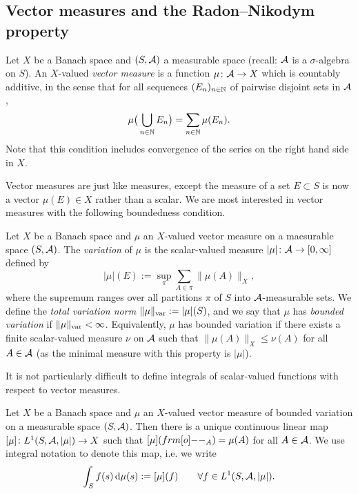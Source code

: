 

\subsection{Vector measures and the Radon--Nikodym property}

\begin{defn}
  Let $X$ be a Banach space and $(S,\mathcal{A})$ a measurable space (recall: $\mathcal{A}$ is a $\sigma$-algebra on $S$).
  An $X$-valued \emph{vector measure} is a function $\mu \colon \mathcal{A} \rightarrow X$ which is countably additive, in the sense that for all sequences $(E_n)_{n \in \mathbb{N}}$ of pairwise disjoint sets in $\mathcal{A}$,
  \begin{equation*}
    \mu\big( \bigcup_{n \in \mathbb{N}} E_n \big) = \sum_{n \in \mathbb{N}} \mu(E_n).
  \end{equation*}
  Note that this condition includes convergence of the series on the right hand side in $X$.
\end{defn}

Vector measures are just like measures, except the measure of a set $E \subset S$ is now a vector $\mu(E) \in X$ rather than a scalar.
We are most interested in vector measures with the following boundedness condition.

\begin{defn}
  Let $X$ be a Banach space and $\mu$ an $X$-valued vector measure on a maesurable space $(S,\mathcal{A})$.
  The \emph{variation} of $\mu$ is the scalar-valued measure $|\mu| \colon \mathcal{A} \rightarrow [0,\infty]$ defined by
  \begin{equation*}
    |\mu|(E) := \sup_{\pi} \sum_{A \in \pi} \|\mu(A)\|_X,
  \end{equation*}
  where the supremum ranges over all partitions $\pi$ of $S$ into $\mathcal{A}$-measurable sets.
  We define the \emph{total variation norm} $\|\mu\|_{\mathrm{var}} := |\mu|(S)$, and we say that $\mu$ has \emph{bounded variation} if $\|\mu\|_{\mathrm{var}} < \infty$.
  Equivalently, $\mu$ has bounded variation if there exists a finite scalar-valued measure $\nu$ on $\mathcal{A}$ such that $\|\mu(A)\|_X \leq \nu(A)$ for all $A \in \mathcal{A}$ (as the minimal measure with this property is $|\mu|$).
\end{defn}

It is not particularly difficult to define integrals of scalar-valued functions with respect to vector measures.

\begin{prop}
  Let $X$ be a Banach space and $\mu$ an $X$-valued vector measure of bounded variation on a measurable space $(S,\mathcal{A})$.
  Then there is a unique continuous linear map $[\mu] \colon L^1(S,\mathcal{A},|\mu|) \rightarrow X$ such that $[\mu](\1_{A}) = \mu(A)$ for all $A \in \mathcal{A}$.
  We use integral notation to denote this map, i.e. we write
  \begin{equation*}
    \int_{S} f(s) \, \mathrm{d}\mu(s) := [\mu](f) \qquad \forall f \in L^1(S,\mathcal{A},|\mu|).
  \end{equation*}
\end{prop}

